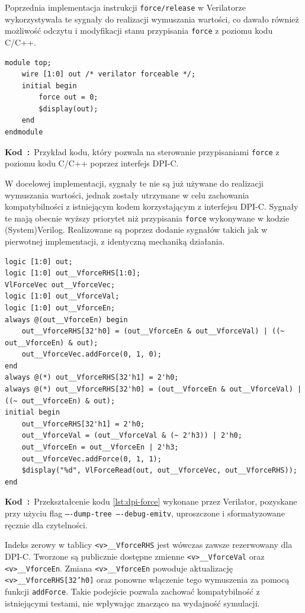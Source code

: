 \documentclass[shortabstract, inz]{iithesis}
\newcounter{kod}[chapter]
\renewcommand{\thekod}{\thechapter\arabic{kod}}
\newcommand{\codecaption}[2]{%
  \par\refstepcounter{kod}\label{#1}%
  \noindent\textbf{Kod~\thekod:}~#2\par
  \vspace*{1.0\baselineskip}%
}
\begin{document}
Poprzednia implementacja instrukcji \texttt{force/release} w Verilatorze wykorzystywała te sygnały do realizacji wymuszania wartości, co dawało również możliwość odczytu i modyfikacji stanu przypisania \texttt{force} z poziomu kodu C/C++.

\begin{verbatim}
module top;
    wire [1:0] out /* verilator forceable */;
    initial begin
        force out = 0;
        $display(out);
    end
endmodule
\end{verbatim}
\codecaption{lst:dpi-force}{Przykład kodu, który pozwala na sterowanie przypisaniami \texttt{force} z poziomu kodu C/C++ poprzez interfejs DPI-C.}

W docelowej implementacji, sygnały te nie są już używane do realizacji wymuszania wartości, jednak zostały utrzymane w celu zachowania kompatybilności z istniejącym kodem korzystającym z interfejsu DPI-C.
Sygnały te mają obecnie wyższy priorytet niż przypisania \texttt{force} wykonywane w kodzie (System)Verilog. Realizowane są poprzez dodanie sygnałów takich jak w pierwotnej implementacji, z identyczną mechaniką działania.

\begin{verbatim}
logic [1:0] out;
logic [1:0] out__VforceRHS[1:0];
VlForceVec out__VforceVec;
logic [1:0] out__VforceVal;
logic [1:0] out__VforceEn;
always @(out__VforceEn) begin
    out__VforceRHS[32'h0] = (out__VforceEn & out__VforceVal) | ((~ out__VforceEn) & out);
    out__VforceVec.addForce(0, 1, 0);
end
always @(*) out__VforceRHS[32'h1] = 2'h0;
always @(*) out__VforceRHS[32'h0] = (out__VforceEn & out__VforceVal) | ((~ out__VforceEn) & out);
initial begin
    out__VforceRHS[32'h1] = 2'h0;
    out__VforceVal = (out__VforceVal & (~ 2'h3)) | 2'h0;
    out__VforceEn = out__VforceEn | 2'h3;
    out__VforceVec.addForce(0, 1, 1);
    $display("%d", VlForceRead(out, out__VforceVec, out__VforceRHS));
end
\end{verbatim}
\codecaption{lst:dpi-force-transformation}{Przekształcenie kodu \ref{lst:dpi-force} wykonane przez Verilator, pozyskane przy użyciu flag \texttt{----dump-tree ----debug-emitv}, uproszczone i sformatyzowane ręcznie dla czytelności.}

Indeks zerowy w tablicy \texttt{<v>\_\_VforceRHS} jest wówczas zawsze rezerwowany dla DPI-C. Tworzone są publicznie dostępne zmienne \texttt{<v>\_\_VforceVal} oraz \texttt{<v>\_\_VforceEn}. Zmiana \texttt{<v>\_\_VforceEn} powoduje aktualizację \texttt{<v>\_\_VforceRHS[32'h0]} oraz ponowne włączenie tego wymuszenia za pomocą funkcji \texttt{addForce}. Takie podejście pozwala zachować kompatybilność z istniejącymi testami, nie wpływając znacząco na wydajność symulacji.
\end{document}
